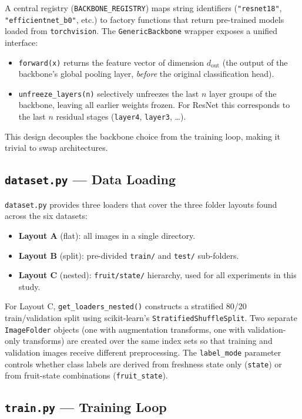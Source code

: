 \documentclass[12pt, a4paper]{article}
\begin{document}
A central registry (\texttt{BACKBONE\_REGISTRY}) maps string identifiers
(\texttt{"resnet18"}, \texttt{"efficientnet\_b0"}, etc.) to factory functions
that return pre-trained models loaded from \texttt{torchvision}.
The \texttt{GenericBackbone} wrapper exposes a unified interface:
\begin{itemize}
    \item \texttt{forward(x)} returns the feature vector of dimension
    $d_\text{out}$ (the output of the backbone's global pooling layer,
    \emph{before} the original classification head).
    \item \texttt{unfreeze\_layers(n)} selectively unfreezes the last $n$
    layer groups of the backbone, leaving all earlier weights frozen.
    For ResNet this corresponds to the last $n$ residual stages
    (\texttt{layer4}, \texttt{layer3}, \ldots).
\end{itemize}
This design decouples the backbone choice from the training loop, making it
trivial to swap architectures.

\subsection{\texttt{dataset.py} --- Data Loading}

\texttt{dataset.py} provides three loaders that cover the three folder layouts
found across the six datasets:
\begin{itemize}
    \item \textbf{Layout A} (flat): all images in a single directory.
    \item \textbf{Layout B} (split): pre-divided \texttt{train/} and
    \texttt{test/} sub-folders.
    \item \textbf{Layout C} (nested): \texttt{fruit/state/} hierarchy,
    used for all experiments in this study.
\end{itemize}
For Layout C, \texttt{get\_loaders\_nested()} constructs a stratified 80/20
train/validation split using scikit-learn's \texttt{StratifiedShuffleSplit}.
Two separate \texttt{ImageFolder} objects (one with augmentation transforms,
one with validation-only transforms) are created over the same index sets so
that training and validation images receive different preprocessing.
The \texttt{label\_mode} parameter controls whether class labels are derived
from freshness state only (\texttt{state}) or from fruit-state combinations
(\texttt{fruit\_state}).

\subsection{\texttt{train.py} --- Training Loop}
\end{document}
